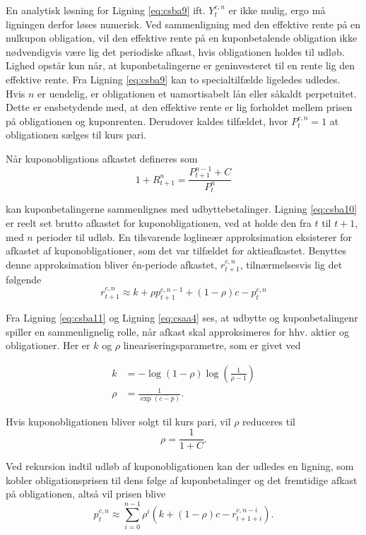 \documentclass[
  a4paper,
  oneside]{memoir}
\begin{document}
En analytisk løsning for Ligning \eqref{eq:csba9} ift. \(Y_t^{c,n}\) er ikke mulig, ergo må ligningen derfor løses numerisk. Ved sammenligning med den effektive rente på en nulkupon obligation, vil den effektive rente på en kuponbetalende obligation ikke nødvendigvis være lig det periodiske afkast, hvis obligationen holdes til udløb. Lighed opstår kun når, at kuponbetalingerne er geninvesteret til en rente lig den effektive rente. Fra Ligning \eqref{eq:csba9} kan to specialtilfælde ligeledes udledes. Hvis \(n\) er uendelig, er obligationen et uamortisabelt lån eller såkaldt perpetuitet. Dette er ensbetydende med, at den effektive rente er lig forholdet mellem prisen på obligationen og kuponrenten. Derudover kaldes tilfældet, hvor \(P_t^{c,n}=1\) at obligationen sælges til kurs pari.

Når kuponobligations afkastet defineres som
\begin{equation}
1+R_{t+1}^n = \frac{P_{t+1}^{n-1}+C}{P_t^n} \label{eq:csba10}
\end{equation}

kan kuponbetalingerne sammenlignes med udbyttebetalinger. Ligning \eqref{eq:csba10} er reelt set brutto afkastet for kuponobligationen, ved at holde den fra \(t\) til \(t+1\), med \(n\) perioder til udløb. En tilsvarende loglineær approksimation eksisterer for afkastet af kuponobligationer, som det var tilfældet for aktieafkastet. Benyttes denne approksimation bliver én-periode afkastet, \(r_{t+1}^{c,n}\), tilnærmelsesvis lig det følgende
\begin{equation}
r_{t+1}^{c,n}\approx k + \rho p_{t+1}^{c,n-1} + (1-\rho)c - p_t^{c,n} \label{eq:csba11}
\end{equation}

Fra Ligning \eqref{eq:csba11} og Ligning \eqref{eq:csaa4} ses, at udbytte og kuponbetalingenr spiller en sammenlignelig rolle, når afkast skal approksimeres for hhv. aktier og obligationer. Her er \(k\) og \(\rho\) lineariseringsparametre, som er givet ved

\begin{align*}
k &= -\log(1-\rho)\log\left(\frac{1}{\rho-1}\right)\\
\rho&= \frac{1}{\exp\left(\overline{c-p}\right)}.
\end{align*}

Hvis kuponobligationen bliver solgt til kurs pari, vil \(\rho\) reduceres til
\[\rho=\frac{1}{1+C}.\]

Ved rekursion indtil udløb af kuponobligationen kan der udledes en ligning, som kobler obligationsprisen til dens følge af kuponbetalinger og det fremtidige afkast på obligationen, altså vil prisen blive
\begin{equation}
p_t^{c,n}\approx\sum_{i=0}^{n-1} \rho^i \left(k+(1-\rho)c - r_{t+1+i}^{c,n-i}\right). \label{eq:csba12}
\end{equation}
\end{document}
